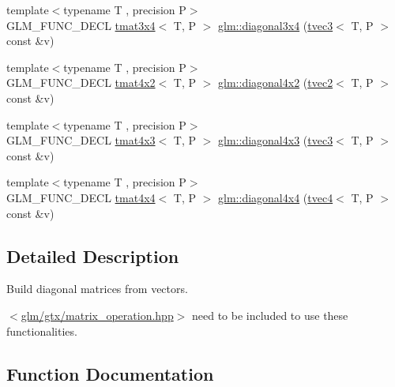 \begin{DoxyCompactItemize}
\item 
{\footnotesize template$<$typename T , precision P$>$ }\\G\+L\+M\+\_\+\+F\+U\+N\+C\+\_\+\+D\+E\+CL \hyperlink{structglm_1_1tmat3x4}{tmat3x4}$<$ T, P $>$ \hyperlink{group__gtx__matrix__operation_gae3f85af86c18c80f2acbe3223feb8e81}{glm\+::diagonal3x4} (\hyperlink{structglm_1_1tvec3}{tvec3}$<$ T, P $>$ const \&v)
\item 
{\footnotesize template$<$typename T , precision P$>$ }\\G\+L\+M\+\_\+\+F\+U\+N\+C\+\_\+\+D\+E\+CL \hyperlink{structglm_1_1tmat4x2}{tmat4x2}$<$ T, P $>$ \hyperlink{group__gtx__matrix__operation_ga70cc5632aa9f41e7cf0b81fee6f2bfe6}{glm\+::diagonal4x2} (\hyperlink{structglm_1_1tvec2}{tvec2}$<$ T, P $>$ const \&v)
\item 
{\footnotesize template$<$typename T , precision P$>$ }\\G\+L\+M\+\_\+\+F\+U\+N\+C\+\_\+\+D\+E\+CL \hyperlink{structglm_1_1tmat4x3}{tmat4x3}$<$ T, P $>$ \hyperlink{group__gtx__matrix__operation_ga4242ea5681f81539e0c5b54fadcd9ddf}{glm\+::diagonal4x3} (\hyperlink{structglm_1_1tvec3}{tvec3}$<$ T, P $>$ const \&v)
\item 
{\footnotesize template$<$typename T , precision P$>$ }\\G\+L\+M\+\_\+\+F\+U\+N\+C\+\_\+\+D\+E\+CL \hyperlink{structglm_1_1tmat4x4}{tmat4x4}$<$ T, P $>$ \hyperlink{group__gtx__matrix__operation_gade576e044d8e52f343166f665589d782}{glm\+::diagonal4x4} (\hyperlink{structglm_1_1tvec4}{tvec4}$<$ T, P $>$ const \&v)
\end{DoxyCompactItemize}


\subsection{Detailed Description}
Build diagonal matrices from vectors. 

$<$\hyperlink{matrix__operation_8hpp}{glm/gtx/matrix\+\_\+operation.\+hpp}$>$ need to be included to use these functionalities. 

\subsection{Function Documentation}
\mbox{\label{group__gtx__matrix__operation_ga01dc503262dba9c457113d131fc8c024}} 
